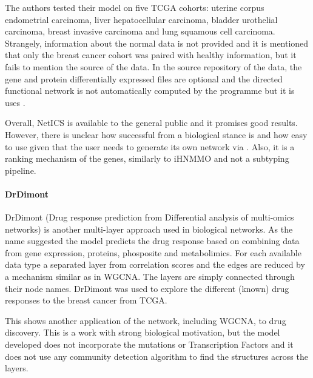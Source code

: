 The authors tested their model on five TCGA cohorts: uterine corpus endometrial carcinoma, liver hepatocellular carcinoma, bladder urothelial carcinoma, breast invasive carcinoma and lung squamous cell carcinoma. Strangely, information about the normal data is not provided and it is mentioned that only the breast cancer cohort was paired with healthy information, but it fails to mention the source of the data. In the source repository of the data, the gene and protein differentially expressed files are optional and the directed functional network is not automatically computed by the programme but it is uses \citet{Wu2010-ap}.

Overall, NetICS is available to the general public and it promises good results. However, there is unclear how successful from a biological stance is and how easy to use given that the user needs to generate its own network via \citet{Wu2010-ap}. Also, it is a ranking mechanism of the genes, similarly to iHNMMO and not a subtyping pipeline.



\paragraph*{DrDimont} \label{s:lit:drDimont}

DrDimont (Drug response prediction from Differential analysis of multi-omics networks) \citet{Hiort2022-lk} is another multi-layer approach used in biological networks. As the name suggested the model predicts the drug response based on combining data from gene expression, proteins, phosposite and metabolimics. For each available data type a separated layer from correlation scores and the edges are reduced by a mechanism similar as in WGCNA. The layers are simply connected through their node names. DrDimont was used to explore the different (known) drug responses to the breast cancer from TCGA.

This shows another application of the network, including WGCNA, to drug discovery. This is a work with strong biological motivation, but the model developed does not incorporate the mutations or Transcription Factors and it does not use any community detection algorithm to find the structures across the layers.
